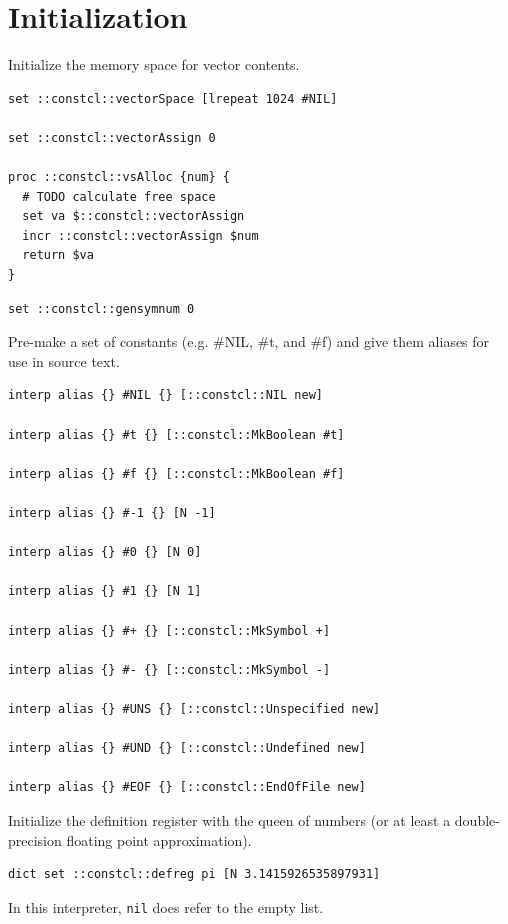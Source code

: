 \documentclass[twoside,9pt]{report}
\begin{document}
\chapter{Initialization}
\label{initialization}


Initialize the memory space for vector contents.

\begin{lstlisting}
set ::constcl::vectorSpace [lrepeat 1024 #NIL]
 
set ::constcl::vectorAssign 0
 
proc ::constcl::vsAlloc {num} {
  # TODO calculate free space
  set va $::constcl::vectorAssign
  incr ::constcl::vectorAssign $num
  return $va
}
\end{lstlisting}
\begin{lstlisting}
set ::constcl::gensymnum 0
\end{lstlisting}


Pre-make a set of constants (e.g. \#NIL, \#t, and \#f) and give them aliases for use in source text.

\begin{lstlisting}
interp alias {} #NIL {} [::constcl::NIL new]
 
interp alias {} #t {} [::constcl::MkBoolean #t]
 
interp alias {} #f {} [::constcl::MkBoolean #f]
 
interp alias {} #-1 {} [N -1]
 
interp alias {} #0 {} [N 0]
 
interp alias {} #1 {} [N 1]
 
interp alias {} #+ {} [::constcl::MkSymbol +]
 
interp alias {} #- {} [::constcl::MkSymbol -]
 
interp alias {} #UNS {} [::constcl::Unspecified new]
 
interp alias {} #UND {} [::constcl::Undefined new]
 
interp alias {} #EOF {} [::constcl::EndOfFile new]
\end{lstlisting}


Initialize the definition register with the queen of numbers (or at least a double-precision floating point approximation).

\begin{lstlisting}
dict set ::constcl::defreg pi [N 3.1415926535897931]
\end{lstlisting}


In this interpreter, \texttt{nil} does refer to the empty list.
\end{document}
